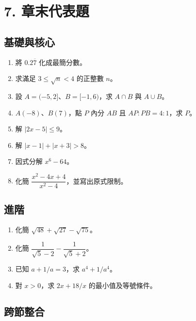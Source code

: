 \documentclass[11pt,a4paper]{article}
\providecommand{\tightlist}{%
  \setlength{\itemsep}{0pt}\setlength{\parskip}{0pt}}
\begin{document}
\section{7. 章末代表題}\label{ux7ae0ux672bux4ee3ux8868ux984c}

\subsection{基礎與核心}\label{ux57faux790eux8207ux6838ux5fc3}

\begin{enumerate}
\def\labelenumi{\arabic{enumi}.}
\tightlist
\item
  將 \(0.2\overline{7}\) 化成最簡分數。
\item
  求滿足 \(3\le\sqrt n<4\) 的正整數 \(n\)。
\item
  設 \(A=(-5,2]\)、\(B=[-1,6)\)，求 \(A\cap B\) 與 \(A\cup B\)。
\item
  \(A(-8)\)、\(B(7)\)，點 \(P\) 內分 \(AB\) 且 \(AP:PB=4:1\)，求 \(P\)。
\item
  解 \(|2x-5|\le9\)。
\item
  解 \(|x-1|+|x+3|>8\)。
\item
  因式分解 \(x^6-64\)。
\item
  化簡 \(\dfrac{x^2-4x+4}{x^2-4}\)，並寫出原式限制。
\end{enumerate}

\subsection{進階}\label{ux9032ux968e}

\begin{enumerate}
\def\labelenumi{\arabic{enumi}.}
\setcounter{enumi}{8}
\tightlist
\item
  化簡 \(\sqrt{48}+\sqrt{27}-\sqrt{75}\)。
\item
  化簡 \(\dfrac1{\sqrt5-2}-\dfrac1{\sqrt5+2}\)。
\item
  已知 \(a+1/a=3\)，求 \(a^4+1/a^4\)。
\item
  對 \(x>0\)，求 \(2x+18/x\) 的最小值及等號條件。
\end{enumerate}

\subsection{跨節整合}\label{ux8de8ux7bc0ux6574ux5408}
\end{document}

